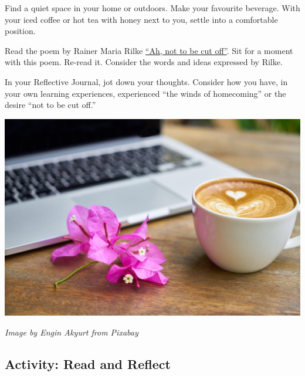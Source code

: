 \documentclass[
]{book}
\begin{document}
\begin{reflect}
Find a quiet space in your home or outdoors. Make your favourite beverage. With your iced coffee or hot tea with honey next to you, settle into a comfortable position.

Read the poem by Rainer Maria Rilke \href{https://gladdestthing.com/poems/ah-not-to-be-cut-off}{``Ah, not to be cut off''}. Sit for a moment with this poem. Re-read it. Consider the words and ideas expressed by Rilke.

In your Reflective Journal, jot down your thoughts. Consider how you have, in your own learning experiences, experienced ``the winds of homecoming'' or the desire ``not to be cut off.''

\includegraphics{assets/unit3/coffee-2242212_1920.jpg}

\emph{Image by Engin Akyurt from Pixabay}
\end{reflect}

\hypertarget{activity-read-and-reflect}{%
\subsection*{Activity: Read and Reflect}\label{activity-read-and-reflect}}
\end{document}
